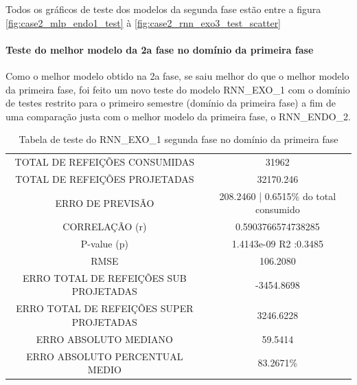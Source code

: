 \documentclass[	12pt, Times, openright, twoside, a4paper, english, brazil]{abntex2}
\begin{document}
    	    Todos os gráficos de teste dos modelos da segunda fase estão entre a figura \ref{fig:case2_mlp_endo1_test} à \ref{fig:case2_rnn_exo3_test_scatter}

    	    \paragraph{Teste do melhor modelo da 2a fase no domínio da primeira fase}
    	        Como o melhor modelo obtido na 2a fase, se saiu melhor do que o melhor modelo da primeira fase, foi feito um novo teste do modelo RNN\_EXO\_1 com o domínio de testes restrito para o primeiro semestre (domínio da primeira fase) a fim de uma comparação justa com o melhor modelo da primeira fase, o RNN\_ENDO\_2.
    	        
                \begin{table}[!ht]
                \centering
                \caption{Tabela de teste do RNN\_EXO\_1 segunda fase no domínio da primeira fase}
                \label{table:case2_rnn_exo_2_incase1}
                    \begin{tabular}{|c|c|}
                    \rowcolor{gray!50}
                    \hline
                    \multicolumn{2}{c}{Melhor modelo da segunda fase testado no domínio do primeiro semestre da primeira fase}\\ \hline     
                    TOTAL DE REFEIÇÕES CONSUMIDAS & 31962\\
                    TOTAL DE REFEIÇÕES PROJETADAS & 32170.246\\
                    ERRO DE PREVISÃO & 208.2460 | 0.6515\% do total consumido\\
                    CORRELAÇÃO (r)& 0.5903766574738285 \\
                    P-value (p) & 1.4143e-09 R2 :0.3485\\
                    RMSE & 106.2080\\
                    ERRO TOTAL DE REFEIÇÕES SUB PROJETADAS & -3454.8698\\
                    ERRO TOTAL DE REFEIÇÕES SUPER PROJETADAS & 3246.6228\\
                    ERRO ABSOLUTO MEDIANO & 59.5414\\
                    ERRO ABSOLUTO PERCENTUAL MEDIO & 83.2671\% \\ \hline
                \end{tabular}
                \end{table}
\end{document}
